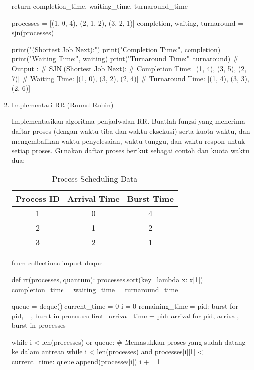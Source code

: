 \documentclass[12pt]{article}
\begin{document}
\begin{enumerate}
\begin{python}
    return completion_time, waiting_time, turnaround_time

processes = [(1, 0, 4), (2, 1, 2), (3, 2, 1)]
completion, waiting, turnaround = sjn(processes)

print("\nSJN (Shortest Job Next):")
print("Completion Time:", completion)
print("Waiting Time:", waiting)
print("Turnaround Time:", turnaround)
# Output : 
# SJN (Shortest Job Next):
# Completion Time: [(1, 4), (3, 5), (2, 7)]
# Waiting Time: [(1, 0), (3, 2), (2, 4)]
# Turnaround Time: [(1, 4), (3, 3), (2, 6)]
\end{python}
        
    \item Implementasi RR (Round Robin)
        \par  Implementasikan algoritma penjadwalan RR. Buatlah fungsi yang menerima daftar proses (dengan waktu tiba dan waktu eksekusi) serta kuota waktu, dan mengembalikan waktu penyelesaian, waktu tunggu, dan waktu respon untuk setiap proses. Gunakan daftar proses berikut sebagai contoh dan kuota waktu dua:
        \begin{table}[h!]
        \centering
        \begin{tabular}{|c|c|c|}
        \hline
        \textbf{Process ID} & \textbf{Arrival Time} & \textbf{Burst Time} \\ \hline
        1 & 0 & 4 \\ \hline
        2 & 1 & 2 \\ \hline
        3 & 2 & 1 \\ \hline
        \end{tabular}
        \caption{Process Scheduling Data}
        \end{table}
        
\begin{python}
from collections import deque

def rr(processes, quantum):
    processes.sort(key=lambda x: x[1]) 
    completion_time = {}
    waiting_time = {}
    turnaround_time = {}
    
    queue = deque()
    current_time = 0
    i = 0
    remaining_time = {pid: burst for pid, _, burst in processes}
    first_arrival_time = {pid: arrival for pid, arrival, burst in processes}

    while i < len(processes) or queue:
        # Memasukkan proses yang sudah datang ke dalam antrean
        while i < len(processes) and processes[i][1] <= current_time:
            queue.append(processes[i])
            i += 1
        

\end{python}
\end{enumerate}
\end{document}
